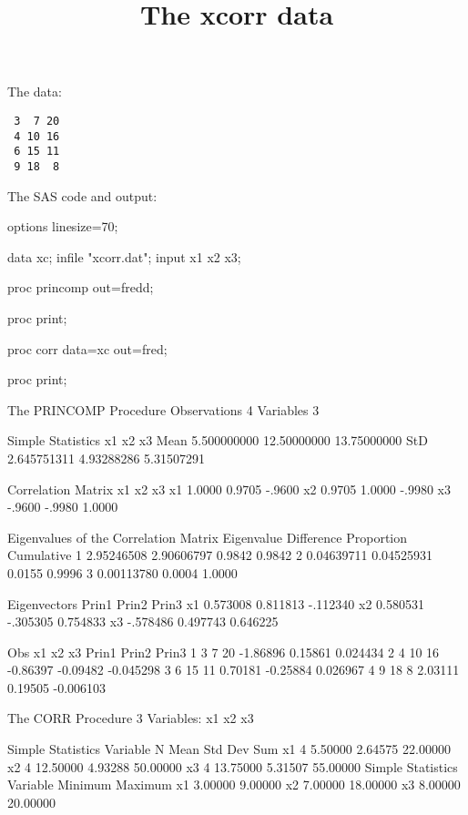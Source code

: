 \documentclass{article}
\title{The xcorr data}
\begin{document}
\maketitle
The data:
\begin{verbatim}
 3  7 20
 4 10 16
 6 15 11
 9 18  8
\end{verbatim}
The SAS code and output:
\begin{Winput}
options linesize=70;

data xc;
  infile "xcorr.dat";
  input x1 x2 x3;

proc princomp out=fredd;

proc print;

proc corr data=xc out=fred;

proc print;


\end{Winput}
\begin{Woutput}
The PRINCOMP Procedure
Observations           4
Variables              3

                    Simple Statistics
                    x1                x2                x3
Mean       5.500000000       12.50000000       13.75000000
StD        2.645751311        4.93288286        5.31507291

          Correlation Matrix
            x1          x2          x3
x1      1.0000      0.9705      -.9600
x2      0.9705      1.0000      -.9980
x3      -.9600      -.9980      1.0000

            Eigenvalues of the Correlation Matrix
        Eigenvalue    Difference    Proportion    Cumulative
   1    2.95246508    2.90606797        0.9842        0.9842
   2    0.04639711    0.04525931        0.0155        0.9996
   3    0.00113780                      0.0004        1.0000

                Eigenvectors
           Prin1         Prin2         Prin3
x1      0.573008      0.811813      -.112340
x2      0.580531      -.305305      0.754833
x3      -.578486      0.497743      0.646225

Obs    x1    x2    x3      Prin1       Prin2       Prin3
 1      3     7    20    -1.86896     0.15861     0.024434
 2      4    10    16    -0.86397    -0.09482    -0.045298
 3      6    15    11     0.70181    -0.25884     0.026967
 4      9    18     8     2.03111     0.19505    -0.006103

The CORR Procedure
   3  Variables:    x1       x2       x3

                      Simple Statistics
Variable           N          Mean       Std Dev           Sum
x1                 4       5.50000       2.64575      22.00000
x2                 4      12.50000       4.93288      50.00000
x3                 4      13.75000       5.31507      55.00000
         Simple Statistics
Variable       Minimum       Maximum
x1             3.00000       9.00000
x2             7.00000      18.00000
x3             8.00000      20.00000


\end{Woutput}
\end{document}
